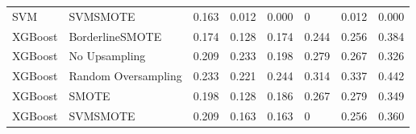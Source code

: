 \begin{tabular}{llllllll}
                            SVM &                      SVMSMOTE & 0.163 &                     0.012 &                 0.000 &                      0 &                                   0.012 &     0.000 \\
                        XGBoost &               BorderlineSMOTE & 0.174 &                     0.128 &                 0.174 &                  0.244 &                                   0.256 &     0.384 \\
                        XGBoost &                 No Upsampling & 0.209 &                     0.233 &                 0.198 &                  0.279 &                                   0.267 &     0.326 \\
                        XGBoost &           Random Oversampling & 0.233 &                     0.221 &                 0.244 &                  0.314 &                                   0.337 &     0.442 \\
                        XGBoost &                         SMOTE & 0.198 &                     0.128 &                 0.186 &                  0.267 &                                   0.279 &     0.349 \\
                        XGBoost &                      SVMSMOTE & 0.209 &                     0.163 &                 0.163 &                      0 &                                   0.256 &     0.360 \\
\bottomrule
\end{tabular}
